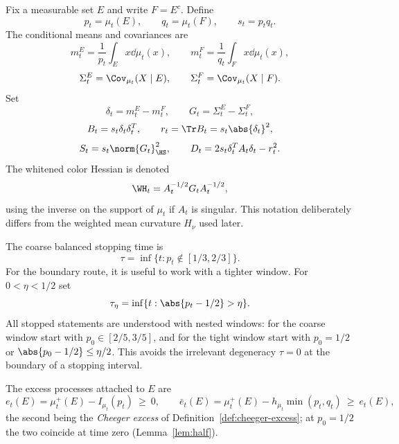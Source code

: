 \documentclass[../../main.tex]{subfiles}
\begin{document}
Fix a measurable set $E$ and write $F=E^c$. Define
\[
  p_t=\mu_t(E),\qquad q_t=\mu_t(F),\qquad s_t=p_tq_t.
\]
The conditional means and covariances are
\[
  m_t^E=\frac1{p_t}\int_E x\dd\mu_t(x),
  \qquad
  m_t^F=\frac1{q_t}\int_F x\dd\mu_t(x),
\]
\[
  \Sigma_t^E=\Cov_{\mu_t}(X\mid E),
  \qquad
  \Sigma_t^F=\Cov_{\mu_t}(X\mid F).
\]
Set
\begin{equation}\label{eq:two-color-core}
  \delta_t=m_t^E-m_t^F,
  \qquad
  G_t=\Sigma_t^E-\Sigma_t^F,
\end{equation}
\begin{equation}\label{eq:two-color-r-S-D}
  B_t=s_t\delta_t\delta_t^T,
  \qquad
  r_t=\Tr B_t=s_t\abs{\delta_t}^2,
\end{equation}
\begin{equation}\label{eq:source-damping}
  S_t=s_t\norm{G_t}_{\HS}^2,
  \qquad
  D_t=2s_t\delta_t^TA_t\delta_t-r_t^2 .
\end{equation}
The whitened color Hessian is denoted
\begin{equation}\label{eq:whitened-H}
  \WH_t=A_t^{-1/2}G_tA_t^{-1/2},
\end{equation}
using the inverse on the support of $\mu_t$ if $A_t$ is singular. This notation deliberately differs
from the weighted mean curvature $H_\nu$ used later.

The coarse balanced stopping time is
\begin{equation}\label{eq:tau-coarse}
  \tau=\inf\{t:p_t\notin[1/3,2/3]\}.
\end{equation}
For the boundary route, it is useful to work with a tighter window. For $0<\eta<1/2$ set
\begin{equation}\label{eq:tau-tight}
  \tau_\eta=\inf\{t:\abs{p_t-1/2}>\eta\}.
\end{equation}
All stopped statements are understood with nested windows: for the coarse window start with
$p_0\in[2/5,3/5]$, and for the tight window start with $p_0=1/2$ or $\abs{p_0-1/2}\le\eta/2$.
This avoids the irrelevant degeneracy $\tau=0$ at the boundary of a stopping interval.

The excess processes attached to $E$ are
\begin{equation}\label{eq:excess-def}
  e_t(E)=\mu_t^+(E)-I_{\mu_t}(p_t)\ \ge\ 0,
  \qquad
  \bar e_t(E)=\mu_t^+(E)-h_{\mu_t}\min(p_t,q_t)\ \ge\ e_t(E),
\end{equation}
the second being the \emph{Cheeger excess} of Definition~\ref{def:cheeger-excess}; at $p_0=1/2$
the two coincide at time zero (Lemma~\ref{lem:half}).
\end{document}
